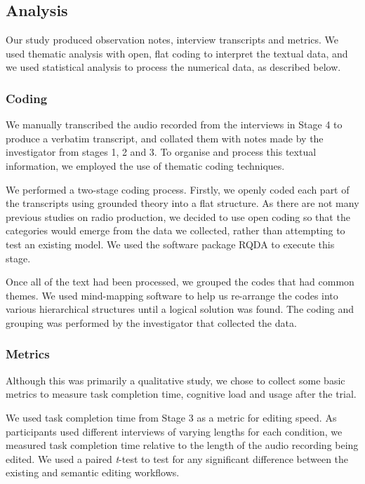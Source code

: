\subsection{Analysis}
Our study produced observation notes, interview transcripts and metrics. We used thematic analysis with open, flat
coding to interpret the textual data, and we used statistical analysis to process the numerical data, as described below.

\subsubsection{Coding}
We manually transcribed the audio recorded from the interviews in Stage 4 to produce a verbatim transcript, and
collated them with notes made by the investigator from stages 1, 2 and 3. To organise and process this textual
information, we employed the use of thematic coding techniques.

We performed a two-stage coding process.  Firstly, we openly coded each part of the transcripts using grounded theory
\citep{Silverman2016} into a flat structure.  As there are not many previous studies on radio production, we decided to
use open coding so that the categories would emerge from the data we collected, rather than attempting to test an
existing model.  We used the software package RQDA \citep{RQDA} to execute this stage.

Once all of the text had been processed, we grouped the codes that had common themes. We used mind-mapping software to
help us re-arrange the codes into various hierarchical structures until a logical solution was found.  The coding
and grouping was performed by the investigator that collected the data.

\subsubsection{Metrics}
Although this was primarily a qualitative study, we chose to collect some basic metrics to measure task completion
time, cognitive load and usage after the trial.

We used task completion time from Stage 3 as a metric for editing speed. As participants used different interviews of
varying lengths for each condition, we measured task completion time relative to the length of the audio
recording being edited. We used a paired \textit{t}-test \citep[p.~17]{Shalabh2009} to test for any significant
difference between the existing and semantic editing workflows.

